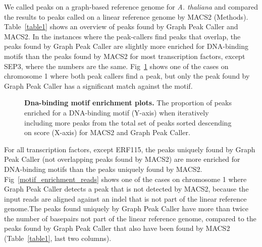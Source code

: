 \documentclass[10pt,letterpaper]{article}
\begin{document}
We called peaks on a graph-based reference genome for \emph{A. thaliana} and compared the results to peaks called on a linear reference genome by MACS2 (Methods). Table~\ref{table1} shows an overview of peaks found by Graph Peak Caller and MACS2. In the instances where the peak-callers find peaks that overlap, the peaks found by Graph Peak Caller are slightly more enriched for DNA-binding motifs than the peaks found by MACS2 for most transcription factors, except SEP3, where the numbers are the same. Fig~\ref{motif_enrichment} shows one of the cases on chromosome 1 where both peak callers find a peak, but only the peak found by Graph Peak Caller has a significant match against the motif.

\begin{figure}
 \caption{{\bf Dna-binding motif enrichment plots.} The proportion of peaks enriched for a DNA-binding motif (Y-axis) when iteratively including more peaks from the total set of peaks sorted descending on score (X-axis) for MACS2 and Graph Peak Caller. }
\label{motif_enrichment}
\end{figure}

For all transcription factors, except ERF115, the peaks uniquely found by Graph Peak Caller (not overlapping peaks found by MACS2) are more enriched for DNA-binding motifs than the peaks uniquely found by MACS2. Fig~\ref{motif_enrichment_reads} shows one of the cases on chromosome 1 where Graph Peak Caller detects a peak that is not detected by MACS2, because the input reads are aligned against an indel that is not part of the linear reference genome.The peaks found uniquely by Graph Peak Caller have more than twice the number of basepairs not part of the linear reference genome, compared to the peaks found by Graph Peak Caller that also have been found by MACS2 (Table~\ref{table1}, last two columns).
\end{document}
